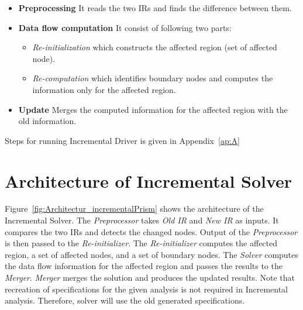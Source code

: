 \documentclass[11pt,a4paper,openright]{report}
\begin{document}
\begin{itemize}
\item \textbf{Preprocessing} It reads the two IRs and finds the difference between them.

\item \textbf{Data flow computation}
It consist of following two parts:
\begin{itemize}
 \item \textit{Re-initialization} which constructs the affected region (set of affected node).
 \item  \textit{Re-computation} which identifies boundary nodes and computes the information only for the affected region.
\end{itemize}

\item \textbf{Update} Merges the computed information for the affected region with the old information.
\end{itemize}

Steps for running Incremental Driver is given in Appendix~\ref{ap:A}

\section{Architecture of Incremental Solver}
Figure~\ref{fig:Architectur_incrementalPrism} shows the architecture of the Incremental Solver. The \textit{Preprocessor}
takes \textit{Old IR} and \textit{New IR} as inputs. It compares the two IRs and detects the changed nodes. 
Output of the \textit{Preprocessor} is then passed to the \textit{Re-initializer}. The \textit{Re-initializer} computes 
the affected region, a set of affected nodes, and a set of boundary nodes. The \textit{Solver} computes the data flow information
for the affected region and passes the results to the \textit{Merger}. \textit{Merger} merges the solution and produces the updated results.
Note that recreation of specifications for the given analysis is not required in Incremental analysis. Therefore, solver will use the old generated specifications.
\end{document}
